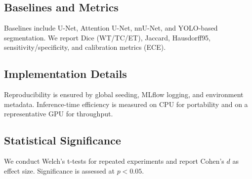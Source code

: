 \subsection{Baselines and Metrics}
Baselines include U-Net, Attention U-Net, nnU-Net, and YOLO-based segmentation. We report Dice (WT/TC/ET), Jaccard, Hausdorff95, sensitivity/specificity, and calibration metrics (ECE).

\subsection{Implementation Details}
Reproducibility is ensured by global seeding, MLflow logging, and environment metadata. Inference-time efficiency is measured on CPU for portability and on a representative GPU for throughput.

\subsection{Statistical Significance}
We conduct Welch's t-tests for repeated experiments and report Cohen's $d$ as effect size. Significance is assessed at $p<0.05$.


